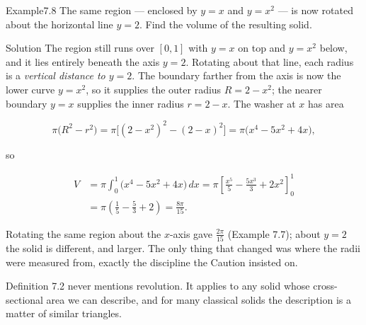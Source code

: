 \documentclass[a4paper,12pt,oneside]{memoir}
\begin{document}
\begin{workedexample}
\begin{envexample}{Example}{7.8}{}
The same region — enclosed by \(y = x\) and \(y = x^{2}\) — is now rotated about the horizontal line \(y = 2\). Find the volume of the resulting solid.
\end{envexample}
\begin{envsolution}{Solution}{}{}
The region still runs over \([0, 1]\) with \(y = x\) on top and \(y = x^{2}\) below, and it lies entirely beneath the axis \(y = 2\). Rotating about that line, each radius is a \emph{vertical distance to \(y = 2\)}. The boundary farther from the axis is now the lower curve \(y = x^{2}\), so it supplies the outer radius \(R = 2 - x^{2}\); the nearer boundary \(y = x\) supplies the inner radius \(r = 2 - x\). The washer at \(x\) has area

\[ \pi\bigl(R^{2} - r^{2}\bigr) = \pi\bigl[(2 - x^{2})^{2} - (2 - x)^{2}\bigr] = \pi\bigl(x^{4} - 5x^{2} + 4x\bigr), \]

so

\[ \begin{aligned}
          V &= \pi\int_{0}^{1} \bigl(x^{4} - 5x^{2} + 4x\bigr)\,dx = \pi\left[\frac{x^{5}}{5} - \frac{5x^{3}}{3} + 2x^{2}\right]_{0}^{1} \\[2pt]
            &= \pi\left(\frac{1}{5} - \frac{5}{3} + 2\right) = \frac{8\pi}{15}.
        \end{aligned} \]

Rotating the same region about the \(x\)-axis gave \(\tfrac{2\pi}{15}\) (Example 7.7); about \(y = 2\) the solid is different, and larger. The only thing that changed was where the radii were measured from, exactly the discipline the Caution insisted on. \qedmark
\end{envsolution}
\end{workedexample}
Definition 7.2 never mentions revolution. It applies to any solid whose cross-sectional area we can describe, and for many classical solids the description is a matter of similar triangles.
\end{document}
